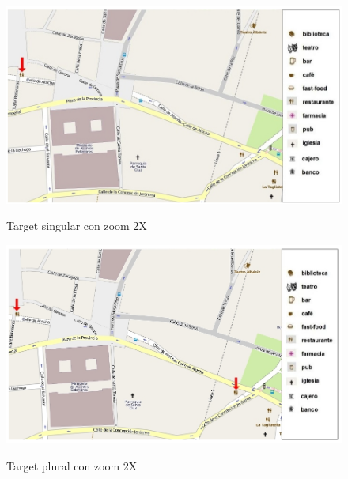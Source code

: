 \begin{figure}
\centering
\includegraphics[width=\textwidth]{figures/rest-singular2x.png}\\[0pt]
\caption{Target singular con zoom 2X}
\label{rest-singular2x}
\end{figure}
\begin{figure}
\centering
\includegraphics[width=\textwidth]{figures/rest-plural2x.png}\\[0pt]
\caption{Target plural con zoom 2X}
\label{rest-plural2x}
\end{figure}


